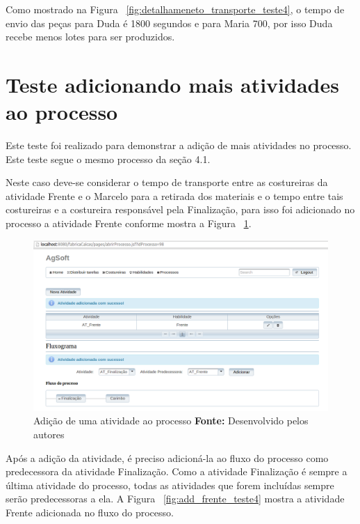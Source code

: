 \par Como mostrado na Figura ~\ref{fig:detalhameneto_transporte_teste4}, o tempo
de envio das peças para Duda é 1800 segundos e para Maria 700, por isso
Duda recebe menos lotes para ser produzidos.


\section{Teste adicionando mais atividades ao processo}

\par Este teste foi realizado para demonstrar a adição de mais atividades no
processo. Este teste segue o mesmo processo da seção 4.1.

\par Neste caso deve-se considerar o tempo de transporte entre as costureiras da atividade Frente e o Marcelo 
para a retirada dos materiais e o tempo entre tais costureiras e a costureira
responsável pela Finalização, para isso foi adicionado no processo a atividade
Frente conforme mostra a Figura ~\ref{fig:add_frente_teste5}.

\begin{figure}[h!]
	\centerline{\includegraphics[scale=0.3]{./imagens/adiconar_atividade_frente_teste5.png}}
	\caption[Adição de uma atividade ao processo]
	{Adição de uma atividade ao processo \textbf{Fonte:} Desenvolvido pelos autores}
	\label{fig:add_frente_teste5}
\end{figure}

\par Após a adição da atividade, é preciso adicioná-la ao fluxo do processo como
predecessora da atividade Finalização. Como a atividade Finalização é sempre a
última atividade do processo, todas as atividades que forem incluídas sempre
serão predecessoras a ela.  A Figura ~\ref{fig:add_frente_teste4} mostra a atividade Frente adicionada
no fluxo do processo.

